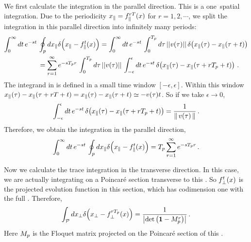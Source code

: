 We first calculate the integration in the parallel direction. This is a
one\dmn\ spatial integration. Due to the periodicity
$x_{\parallel}= f^{rT}_{\parallel}(x)$ for $r=1, 2,\cdots$, we
split the integration
in this parallel direction into infinitely many periods:
\begin{align}
 \int_{0}^\infty dt \, e^{-s t} \, & \oint_p dx_{\parallel}
  \delta\negthinspace\left( {x_\parallel -  f^t_{\parallel}(x)} \right)
  =  \int_{0}^\infty dt \, e^{-s t} \, \int_0^{T_p} d\tau \,||v(\tau)|| \,
  \delta\negthinspace\left( {x_\parallel(\tau) -  x_{\parallel}(\tau + t)} \right)
    \label{eq:detpara1}   \\
  & = \sum_{r=1}^{\infty}  e^{-s {T_{p}}r} \,
    \int_0^{T_p} d\tau \, ||v(\tau)||\,  \int_{-\epsilon}^{\epsilon} dt \, e^{-s t} \,
    \delta\negthinspace\left( {x_\parallel(\tau) -   x_{\parallel}(\tau + rT_p + t)} \right)
    \label{eq:detpara2}
    \,.
\end{align}
The integrand in  is defined in a small time window
$[-\epsilon, \epsilon]$. Within this window
$x_\parallel(\tau) -   x_{\parallel}(\tau + rT + t) =
x_\parallel(\tau) -   x_{\parallel}(\tau + t) \simeq -v(\tau)t$.
So if we take $\epsilon \to 0$,
\[
  \int_{-\epsilon}^{\epsilon} dt \, e^{-s t} \,
  \delta\negthinspace\left( {x_\parallel(\tau) -   x_{\parallel}(\tau + rT_p + t)} \right)
  = \frac{1}{\left\Arrowvert \, v(\tau) \, \right\Arrowvert}
  \,.
\]
Therefore, we obtain the integration in the parallel direction,
\begin{equation}
  \label{eq:detpara3}
  \int_{0}^\infty dt \, e^{-s t} \, \oint_p dx_{\parallel}
  \delta\negthinspace\left( {x_\parallel -  f^t_{\parallel}(x)} \right)
  =  T_p \sum_{r=1}^{\infty}  e^{-s {T_{p}}r}
  \,.
\end{equation}

Now we calculate the trace integration in the transverse direction.
In this case,
we are actually integrating on a Poincar\'e section transverse to this
\po. So $f^t_\perp(x)$ is the projected evolution function
in this section, which has codimension one with the full \statesp.
Therefore,
\begin{equation}
  \label{eq:dettrans}
  \int_{\mathcal{P}} dx_{\perp} \delta\negthinspace\left( {x_{\perp}- f^{rT_p}_{\perp}(x)} \right)
  = {1 \over \left|\mathrm{det}\,\!\left({\bf 1}-M_p^{r}\right)\right| }
  \,.
\end{equation}
Here $M_p$ is the Floquet matrix projected on the Poincar\'e section
of this \po.

